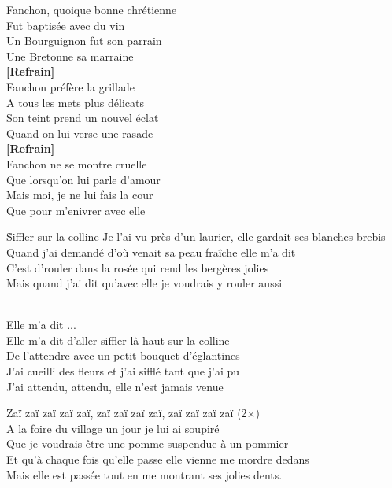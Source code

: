 \documentclass{novel}
\begin{document}
Fanchon, quoique bonne chrétienne \\
Fut baptisée avec du vin \\
Un Bourguignon fut son parrain \\
Une Bretonne sa marraine \\

\textbf{[Refrain]} \\

Fanchon préfère la grillade \\
A tous les mets plus délicats \\
Son teint prend un nouvel éclat \\
Quand on lui verse une rasade \\

\textbf{[Refrain]} \\

Fanchon ne se montre cruelle \\
Que lorsqu'on lui parle d'amour \\
Mais moi, je ne lui fais la cour \\
Que pour m'enivrer avec elle

\newpage
\large
\h*{Siffler sur la colline}
Je l'ai vu près d'un laurier, elle gardait ses blanches brebis \\
Quand j'ai demandé d'où venait sa peau fraîche elle m'a dit \\
C'est d'rouler dans la rosée qui rend les bergères jolies \\
Mais quand j'ai dit qu'avec elle je voudrais y rouler aussi \\

\begin{bfseries}
[Refrain:]\\
Elle m'a dit ... \\
Elle m'a dit d'aller siffler là-haut sur la colline \\
De l'attendre avec un petit bouquet d'églantines \\
J'ai cueilli des fleurs et j'ai sifflé tant que j'ai pu \\
J'ai attendu, attendu, elle n'est jamais venue \\
\end{bfseries}

Zaï zaï zaï zaï zaï, zaï zaï zaï zaï, zaï zaï zaï zaï (2×) \\

A la foire du village un jour je lui ai soupiré \\
Que je voudrais être une pomme suspendue à un pommier \\
Et qu'à chaque fois qu'elle passe elle vienne me mordre dedans \\
Mais elle est passée tout en me montrant ses jolies dents. \\
\end{document}
